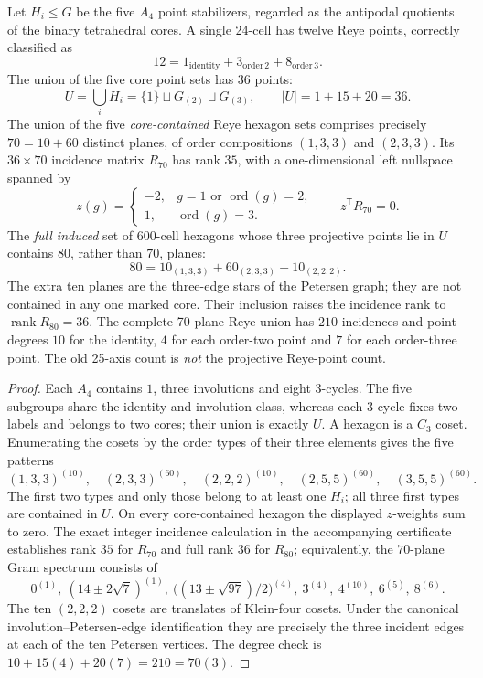 \documentclass[11pt]{article}
\begin{document}
\begin{theorem}
\label{p1:thm:v340-reye-70-80}
Let $H_i\le G$ be the five $A_4$ point stabilizers, regarded as the
antipodal quotients of the binary tetrahedral cores. A single
24-cell has twelve Reye points, correctly classified as
\[
12=1_{\mathrm{identity}}+3_{\mathrm{order}\,2}
   +8_{\mathrm{order}\,3}.
\]
The union of the five core point sets has 36 points:
\[
 U=\bigcup_i H_i=\{1\}\sqcup G_{(2)}\sqcup G_{(3)},
 \qquad |U|=1+15+20=36.
\]
The union of the five \emph{core-contained} Reye hexagon sets
comprises precisely $70=10+60$ distinct planes, of order compositions
$(1,3,3)$ and $(2,3,3)$. Its $36\times70$ incidence matrix
$R_{70}$ has rank $35$, with a one-dimensional left nullspace
spanned by
\[
 z(g)=\begin{cases}-2,&g=1\text{ or }\operatorname{ord}(g)=2,\\
                         1,&\operatorname{ord}(g)=3.
       \end{cases}
 \qquad z^{\mathsf T}R_{70}=0.
\]
The \emph{full induced} set of 600-cell hexagons whose three
projective points lie in $U$ contains $80$, rather than $70$, planes:
\[
 \boxed{80=10_{(1,3,3)}+60_{(2,3,3)}+10_{(2,2,2)}}.
\]
The extra ten planes are the three-edge stars of the Petersen graph;
they are not contained in any one marked core. Their inclusion
raises the incidence rank to $\operatorname{rank}R_{80}=36$.
The complete 70-plane Reye union has $210$ incidences and point degrees
$10$ for the identity, $4$ for each order-two point and $7$ for
each order-three point. The old 25-axis count is \emph{not} the
projective Reye-point count.
\end{theorem}
\begin{proof}
Each $A_4$ contains $1$, three involutions and eight 3-cycles.
The five subgroups share the identity and involution class, whereas
each 3-cycle fixes two labels and belongs to two cores; their union
is exactly $U$. A hexagon is a $C_3$ coset. Enumerating the cosets
by the order types of their three elements gives the five patterns
\[
(1,3,3)^{(10)},\quad(2,3,3)^{(60)},\quad(2,2,2)^{(10)},
\quad(2,5,5)^{(60)},\quad(3,5,5)^{(60)}.
\]
The first two types and only those belong to at least one $H_i$;
all three first types are contained in $U$. On every core-contained
hexagon the displayed $z$-weights sum to zero. The exact integer
incidence calculation in the accompanying certificate establishes
rank $35$ for $R_{70}$ and full rank $36$ for $R_{80}$; equivalently,
the $70$-plane Gram spectrum consists of
\[
0^{(1)},\ (14\pm2\sqrt7)^{(1)},\
\bigl((13\pm\sqrt{97})/2\bigr)^{(4)},\
3^{(4)},\ 4^{(10)},\ 6^{(5)},\ 8^{(6)}.
\]
The ten $(2,2,2)$ cosets are translates of Klein-four cosets.
Under the canonical involution--Petersen-edge identification they
are precisely the three incident edges at each of the ten Petersen
vertices. The degree check is $10+15(4)+20(7)=210=70(3)$.
\end{proof}
\end{document}
